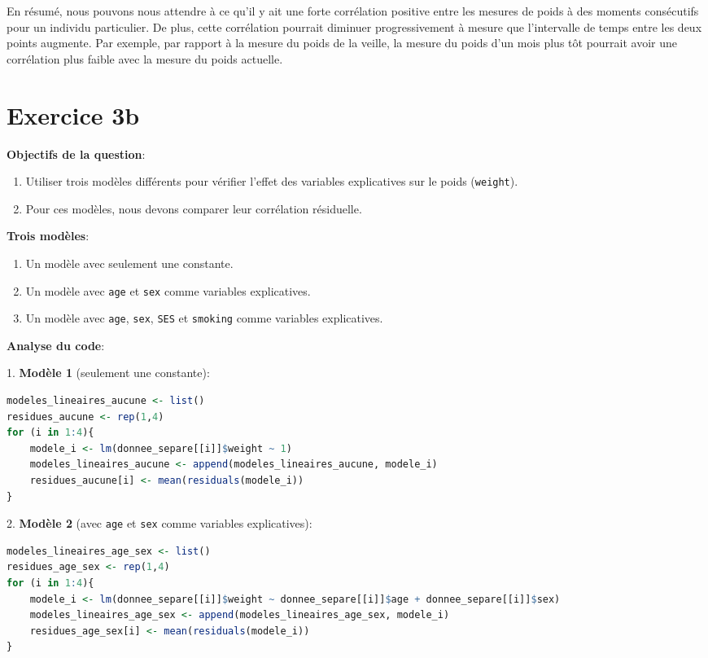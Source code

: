 \documentclass[../main.tex]{subfiles}
\begin{document}
\begin{CJK*}{UTF8}{gbsn}
En résumé, nous pouvons nous attendre à ce qu'il y ait 
une forte corrélation positive entre les mesures de poids 
à des moments consécutifs pour un individu particulier. 
De plus, cette corrélation pourrait diminuer progressivement 
à mesure que l'intervalle de temps entre les deux points augmente. 
Par exemple, par rapport à la mesure du poids de la veille, 
la mesure du poids d'un mois plus tôt pourrait avoir une corrélation plus faible avec la mesure du poids actuelle.

\section*{Exercice 3b}

\textbf{Objectifs de la question}:
\begin{enumerate}
    \item Utiliser trois modèles différents pour vérifier l'effet des variables explicatives sur le poids (\texttt{weight}).
    \item Pour ces modèles, nous devons comparer leur corrélation résiduelle.
\end{enumerate}

\textbf{Trois modèles}:
\begin{enumerate}
    \item Un modèle avec seulement une constante.
    \item Un modèle avec \texttt{age} et \texttt{sex} comme variables explicatives.
    \item Un modèle avec \texttt{age}, \texttt{sex}, \texttt{SES} et \texttt{smoking} comme variables explicatives.
\end{enumerate}

\textbf{Analyse du code}:

1. \textbf{Modèle 1} (seulement une constante):

   \begin {lstlisting}[language=R]
  modeles_lineaires_aucune <- list()
residues_aucune <- rep(1,4)
for (i in 1:4){
    modele_i <- lm(donnee_separe[[i]]$weight ~ 1)
    modeles_lineaires_aucune <- append(modeles_lineaires_aucune, modele_i)
    residues_aucune[i] <- mean(residuals(modele_i))
}
  \end{lstlisting}

2. \textbf{Modèle 2} (avec \texttt{age} et \texttt{sex} comme variables explicatives):

   \begin {lstlisting}[language=R]
   modeles_lineaires_age_sex <- list()
residues_age_sex <- rep(1,4)
for (i in 1:4){
    modele_i <- lm(donnee_separe[[i]]$weight ~ donnee_separe[[i]]$age + donnee_separe[[i]]$sex)
    modeles_lineaires_age_sex <- append(modeles_lineaires_age_sex, modele_i)
    residues_age_sex[i] <- mean(residuals(modele_i))
}


\end{lstlisting}
\end{CJK*}
\end{document}
